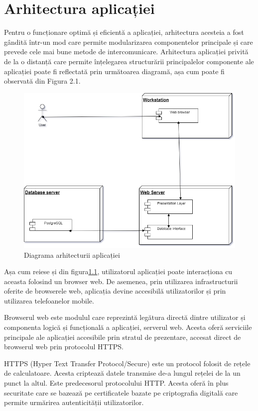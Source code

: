 \documentclass[12pt,a4paper]{report}
\theoremstyle{definition}
\theoremstyle{remark}
\begin{document}
\chapter{Arhitectura aplicației}
\par Pentru o funcționare optimă și eficientă a aplicației, arhitectura acesteia a fost gândită într-un mod care permite modularizarea componentelor principale și care prevede cele mai bune metode de intercomunicare. Arhitectura aplicației privită de la o distanță care permite înțelegarea structurării principalelor componente ale aplicației poate fi reflectată prin următoarea diagramă, așa cum poate fi observată din Figura 2.1.

\begin{figure}[H]
    \centering
    \includegraphics[width=0.75\linewidth]{resurse/diagrame/Diagrama_Arhitectura2.drawio.png}
    \caption{Diagrama arhitecturii aplicației}\label{fig:arhitect}
\end{figure}

\par Așa cum reiese și din figura\ref{fig:arhitect}, utilizatorul aplicației poate interacționa cu aceasta folosind un browser web. De asemenea, prin utilizarea infrastructurii oferite de browserele web, aplicația devine accesibilă utilizatorilor și prin utilizarea telefoanelor mobile. 

\par Browserul web este modulul care reprezintă legătura directă dintre utilizator și componenta logică și funcțională a aplicației, serverul web. Acesta oferă serviciile principale ale aplicației accesibile prin stratul de prezentare, accesat direct de browserul web prin protocolul HTTPS\@.

\par HTTPS (Hyper Text Transfer Protocol/Secure) este un protocol folosit de rețele de calculatoare. Acesta criptează datele transmise de-a lungul rețelei de la un punct la altul. Este predecesorul protocolului HTTP\@. Acesta oferă în plus securitate care se bazează pe certificatele bazate pe criptografia digitală care permite urmărirea autenticității utilizatorilor.
\end{document}
